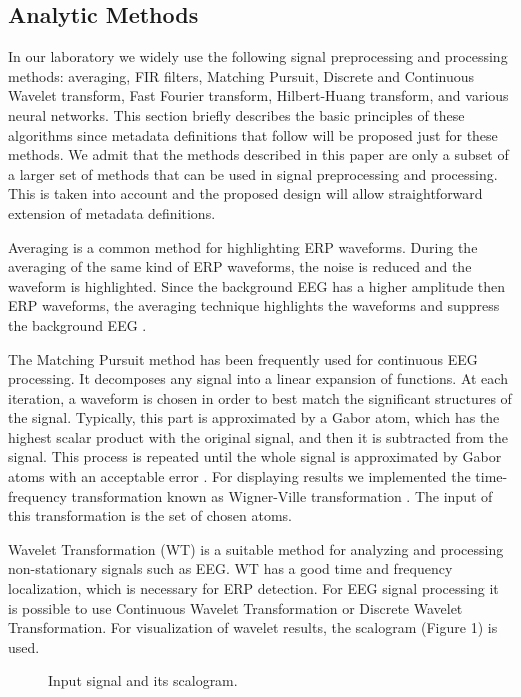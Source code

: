 \documentclass[a4paper,twoside]{article}
\begin{document}
\subsection{Analytic Methods}

\noindent In our laboratory we widely use the following signal preprocessing and processing methods: averaging, FIR filters, Matching Pursuit, Discrete and Continuous Wavelet transform, Fast Fourier transform, Hilbert-Huang transform, and various neural networks. This section briefly describes the basic principles of these algorithms since metadata definitions that follow will be proposed just for these methods. We admit that the methods described in this paper are only a subset of a larger set of methods that can be used in signal preprocessing and processing. This is taken into account and the proposed design will allow straightforward extension of metadata definitions.

Averaging \cite{Sanei07} is a common method for highlighting ERP waveforms. During the averaging of  the  same  kind  of  ERP  waveforms,  the  noise  is  reduced  and  the  waveform  is  highlighted. Since the background  EEG  has a higher  amplitude  then  ERP  waveforms, the averaging technique highlights the waveforms and suppress the background EEG \cite{Vidal77}.

The Matching Pursuit method has been frequently used for continuous EEG processing. It decomposes any signal into a linear expansion of functions. At each iteration, a waveform is chosen in order to best match the
significant structures of the signal. Typically, this part is approximated by a Gabor atom, which has the highest scalar product with the original signal, and then it is subtracted from the signal. This process is repeated until the whole signal is approximated by Gabor atoms with an acceptable error \cite{Vareka12}. For displaying results we implemented the time-frequency transformation known as Wigner-Ville transformation \cite{Quian02}. The input of this transformation is the set of chosen atoms.

Wavelet Transformation (WT) \cite{Ciniburk10} is a suitable method for analyzing and processing non-stationary signals such as EEG. WT has a good time and frequency localization, which is necessary for ERP detection. For EEG signal processing it is possible to use Continuous Wavelet Transformation or Discrete Wavelet Transformation. For visualization of wavelet results, the scalogram (Figure 1) is used.

\begin{figure}[!h]

  \centering
   {}
  \caption{Input signal and its scalogram. \cite{Rondik12} }
  \label{fig:scalogram}
 \end{figure}
\end{document}
